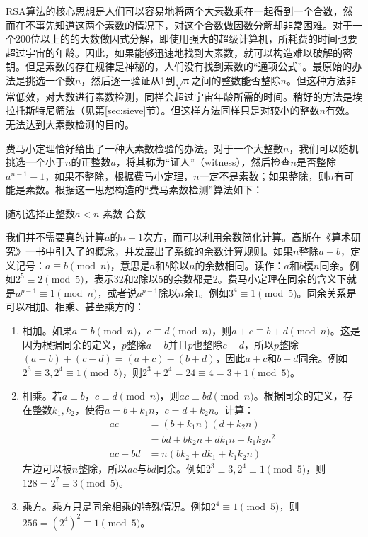 \documentclass[b5paper]{ctexart}
\begin{document}
RSA算法的核心思想是人们可以容易地将两个大素数乘在一起得到一个合数，然而在不事先知道这两个素数的情况下，对这个合数做因数分解却非常困难。对于一个200位以上的的大数做因式分解，即使用强大的超级计算机，所耗费的时间也要超过宇宙的年龄。因此，如果能够迅速地找到大素数，就可以构造难以破解的密钥。但是素数的存在规律是神秘的，人们没有找到素数的“通项公式”。最原始的办法是挑选一个数$n$，然后逐一验证从1到$\sqrt{n}$之间的整数能否整除$n$。但这种方法非常低效，对大数进行素数检测，同样会超过宇宙年龄所需的时间。稍好的方法是埃拉托斯特尼筛法（见第\ref{sec:sieve}节）。但这样方法同样只是对较小的整数$n$有效。无法达到大素数检测的目的。

费马小定理恰好给出了一种大素数检验的办法。对于一个大整数$n$，我们可以随机挑选一个小于$n$的正整数$a$，将其称为“证人”（witness），然后检查$n$是否整除$a^{n-1} - 1$，如果不整除，根据费马小定理，$n$一定不是素数；如果整除，则$n$有可能是素数。根据这一思想构造的“费马素数检测”算法如下：

\begin{algorithmic}
  \State 随机选择正整数$a < n$
    \State \Return 素数
  \Else
    \State \Return 合数
  \EndIf
\EndFunction
\end{algorithmic}

我们并不需要真的计算$a$的$n-1$次方，而可以利用余数简化计算。高斯在《算术研究》一书中引入了的概念，并发展出了系统的余数计算规则。如果$n$整除$a - b$，定义记号：$a \equiv b \pmod{n}$，意思是$a$和$b$除以$n$的余数相同。读作：$a$和$b$模$n$同余。例如$2^5 \equiv 2 \pmod{5}$，表示32和2除以5的余数都是2。费马小定理在同余的含义下就是$a^{p-1} \equiv 1 \pmod{n}$，或者说$a^{p-1}$除以$n$余1。例如$3^4 \equiv 1 \pmod{5}$。同余关系是可以相加、相乘、甚至乘方的：

\begin{enumerate}[(1)]
\item 相加。如果$a \equiv b \pmod{n}$，$c \equiv d \pmod{n}$，则$a + c \equiv b + d \pmod{n}$。这是因为根据同余的定义，$p$整除$a - b$并且$p$也整除$c - d$，所以$p$整除$(a - b) + (c - d) = (a + c) - (b + d)$，因此$a + c$和$b + d$同余。例如$2^3 \equiv 3, 2^4 \equiv 1 \pmod{5}$，则$2^3 + 2^4 = 24 \equiv 4 = 3 + 1 \pmod{5}$。

\item 相乘。若$a \equiv b，c \equiv d \pmod{n}$，则$ac \equiv bd \pmod{n}$。根据同余的定义，存在整数$k_1, k_2$，使得$a = b + k_1n$，$c = d + k_2n$。计算：
  \begin{align*}
    ac &= (b + k_1n)(d + k_2n) \\
       &= bd + bk_2n + dk_1n + k_1k_2n^2 \\
    ac - bd &= n(bk_2 + dk_1 + k_1k_2n)
  \end{align*}
左边可以被$n$整除，所以$ac$与$bd$同余。例如$2^3 \equiv 3, 2^4 \equiv 1 \pmod{5}$，则$128 = 2^7 \equiv 3 \pmod{5}$。

\item 乘方。乘方只是同余相乘的特殊情况。例如$2^4 \equiv 1 \pmod{5}$，则$256 = (2^4)^2 \equiv 1 \pmod{5}$。
\end{enumerate}
\end{document}
